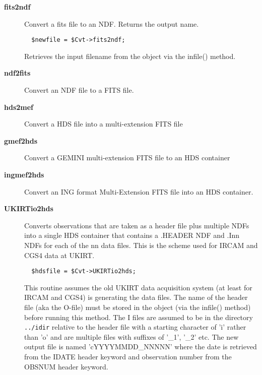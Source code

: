 \begin{description}

\item[{\textbf{fits2ndf}}] \mbox{}

Convert a fits file to an NDF.
Returns the output name.

\begin{verbatim}
  $newfile = $Cvt->fits2ndf;
\end{verbatim}


Retrieves the input filename from the object via the infile()
method.


\item[{\textbf{ndf2fits}}] \mbox{}

Convert an NDF file to a FITS file.


\item[{\textbf{hds2mef}}] \mbox{}

Convert a HDS file into a multi-extension FITS file


\item[{\textbf{gmef2hds}}] \mbox{}

Convert a GEMINI multi-extension FITS file to an HDS container


\item[{\textbf{ingmef2hds}}] \mbox{}

Convert an ING format Multi-Extension FITS file into an HDS container.


\item[{\textbf{UKIRTio2hds}}] \mbox{}

Converts observations that are taken as a header file plus multiple
NDFs into a single HDS container that contains a .HEADER NDF and
.Inn NDFs for each of the nn data files. This is the scheme used for
IRCAM and CGS4 data at UKIRT.

\begin{verbatim}
  $hdsfile = $Cvt->UKIRTio2hds;
\end{verbatim}


This routine assumes the old UKIRT data acquisition system (at least for
IRCAM and CGS4) is generating the data files. The name of the header
file (aka the O-file) must be stored in the object (via the infile()
method) before running this method. The I files are assumed to be in
the directory \texttt{../idir} relative to the header file with a starting
character of 'i' rather than 'o' and are multiple files with
suffixes of '\_1', '\_2' etc. The new output file
is named 'cYYYYMMDD\_NNNNN' where the date is retrieved from the IDATE header
keyword and observation number from the OBSNUM header keyword.




\end{description}
